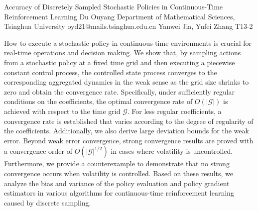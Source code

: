 \begin{talk}
  {Accuracy of Discretely Sampled Stochastic Policies in Continuous-Time Reinforcement Learning}%
  {Du Ouyang}%
  {Department of Mathematical Sciences, Tsinghua University}%
  {oyd21@mails.tsinghua.edu.cn}%
  {Yanwei Jia, Yufei Zhang}%
  {T13-2}%
			


\medskip

How to execute a stochastic policy in continuous-time environments is crucial for real-time operations and decision making. We show that, by sampling actions from a stochastic policy at a fixed time grid and then executing a piecewise constant control process, the controlled state process converges to the corresponding aggregated dynamics in the weak sense as the grid size shrinks to zero and obtain the convergence rate. Specifically, under sufficiently regular conditions on the coefficients, the optimal convergence rate of $O(|\mathscr{G}|)$ is achieved with respect to the time grid $\mathscr{G}$. For less regular coefficients, a convergence rate is established that varies according to the degree of regularity of the coefficients. Additionally, we also derive large deviation bounds for the weak error. Beyond weak error convergence, strong convergence results are proved with a convergence order of $O(|\mathscr{G}|^{1/2})$ in cases where volatility is uncontrolled. Furthermore, we provide a counterexample to demonstrate that no strong convergence occurs when volatility is controlled. Based on these results, we analyze the bias and variance of the policy evaluation and policy gradient estimators in various algorithms for continuous-time reinforcement learning caused by discrete sampling.


\end{talk}

